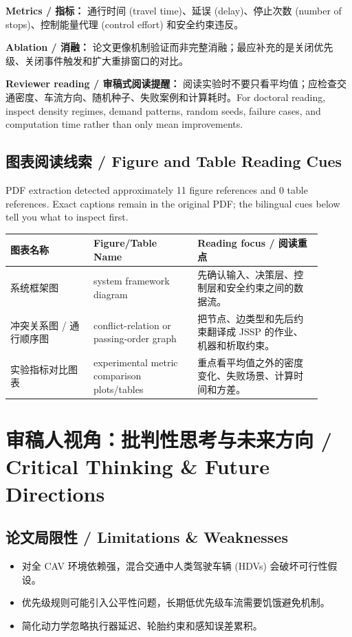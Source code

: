 \documentclass[UTF8,a4paper,11pt,fontset=fandol]{ctexart}
\begin{document}
\textbf{Metrics / 指标：} 通行时间 (travel time)、延误 (delay)、停止次数 (number of stops)、控制能量代理 (control effort) 和安全约束违反。

\textbf{Ablation / 消融：} 论文更像机制验证而非完整消融；最应补充的是关闭优先级、关闭事件触发和扩大重排窗口的对比。

\textbf{Reviewer reading / 审稿式阅读提醒：} 阅读实验时不要只看平均值；应检查交通密度、车流方向、随机种子、失败案例和计算耗时。For doctoral reading, inspect density regimes, demand patterns, random seeds, failure cases, and computation time rather than only mean improvements.

\subsection{图表阅读线索 / Figure and Table Reading Cues}
PDF extraction detected approximately 11 figure references and 0 table references. Exact captions remain in the original PDF; the bilingual cues below tell you what to inspect first.

\begin{longtable}{p{0.24\linewidth}p{0.30\linewidth}p{0.36\linewidth}}
\toprule
图表名称 & Figure/Table Name & Reading focus / 阅读重点\\
\midrule
系统框架图 & system framework diagram & 先确认输入、决策层、控制层和安全约束之间的数据流。 \\
冲突关系图 / 通行顺序图 & conflict-relation or passing-order graph & 把节点、边类型和先后约束翻译成 JSSP 的作业、机器和析取约束。 \\
实验指标对比图表 & experimental metric comparison plots/tables & 重点看平均值之外的密度变化、失败场景、计算时间和方差。 \\
\bottomrule
\end{longtable}

\section{审稿人视角：批判性思考与未来方向 / Critical Thinking \& Future Directions}
\subsection{论文局限性 / Limitations \& Weaknesses}
\begin{itemize}
\item 对全 CAV 环境依赖强，混合交通中人类驾驶车辆 (HDVs) 会破坏可行性假设。
\item 优先级规则可能引入公平性问题，长期低优先级车流需要饥饿避免机制。
\item 简化动力学忽略执行器延迟、轮胎约束和感知误差累积。
\end{itemize}
\end{document}
